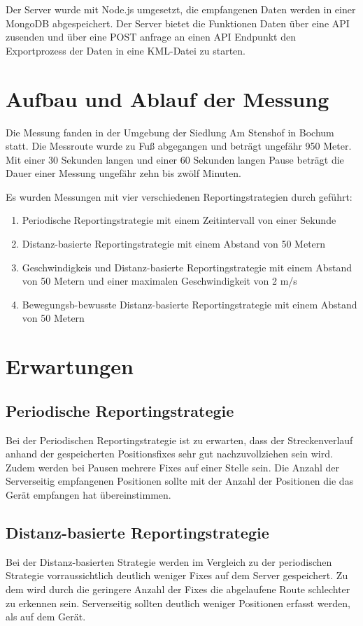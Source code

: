 Der Server wurde mit Node.js umgesetzt, die empfangenen Daten werden in einer MongoDB abgespeichert. Der Server bietet die Funktionen Daten über eine API zusenden und über eine POST anfrage an einen API Endpunkt den Exportprozess der Daten in eine KML-Datei zu starten.

\section{Aufbau und Ablauf der Messung}
Die Messung fanden in der Umgebung der Siedlung Am Stenshof in Bochum statt. Die Messroute wurde zu Fuß abgegangen und beträgt ungefähr 950 Meter. Mit einer 30 Sekunden langen und einer 60 Sekunden langen Pause beträgt die Dauer einer Messung ungefähr zehn bis zwölf Minuten.

Es wurden Messungen mit vier verschiedenen Reportingstrategien durch geführt:
\begin{enumerate}
	\item{Periodische Reportingstrategie mit einem Zeitintervall von einer Sekunde}
	\item{Distanz-basierte Reportingstrategie mit einem Abstand von 50 Metern}
	\item{Geschwindigkeis und Distanz-basierte Reportingstrategie mit einem Abstand von 50 Metern und einer maximalen Geschwindigkeit von 2 m/s}
	\item{Bewegungsb-bewusste Distanz-basierte Reportingstrategie mit einem Abstand von 50 Metern}
\end{enumerate}

\section{Erwartungen}

\subsection{Periodische Reportingstrategie}
Bei der Periodischen Reportingstrategie ist zu erwarten, dass der Streckenverlauf anhand der gespeicherten Positionsfixes sehr gut nachzuvollziehen sein wird. Zudem werden bei Pausen mehrere Fixes auf einer Stelle sein. Die Anzahl der Serverseitig empfangenen Positionen sollte mit der Anzahl der Positionen die das Gerät empfangen hat übereinstimmen.

\subsection{Distanz-basierte Reportingstrategie}
Bei der Distanz-basierten Strategie werden im Vergleich zu der periodischen Strategie vorraussichtlich deutlich weniger Fixes auf dem Server gespeichert. Zu dem wird durch die geringere Anzahl der Fixes die abgelaufene Route schlechter zu erkennen sein. Serverseitig sollten deutlich weniger Positionen erfasst werden, als auf dem Gerät.


